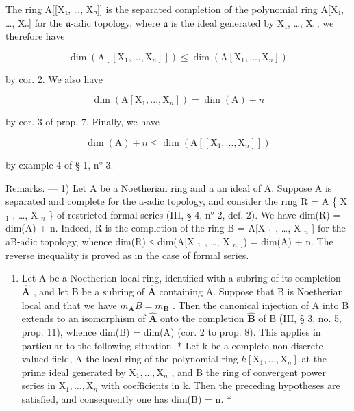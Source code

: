 The ring A{[}{[}X₁, \ldots, Xₙ{]}{]} is the separated completion of the polynomial ring A{[}X₁, \ldots, Xₙ{]} for the \(\mathfrak{a}\)-adic topology, where \(\mathfrak{a}\) is the ideal generated by X₁, \ldots, Xₙ; we therefore have

\[
\dim (\mathrm{A} [ [ \mathrm{X} _ {1},..., \mathrm{X} _ {n} ] ]) \leqslant \dim (\mathrm{A} [ \mathrm{X} _ {1},..., \mathrm{X} _ {n} ])
\]

by cor. 2. We also have

\[
\dim (\mathrm{A} [ \mathrm{X} _ {1},..., \mathrm{X} _ {n} ]) = \dim (\mathrm{A}) + n
\]

by cor. 3 of prop. 7. Finally, we have

\[
\dim (\mathrm{A}) + n \leqslant \dim (\mathrm{A} [ [ \mathrm{X} _ {1},..., \mathrm{X} _ {n} ] ])
\]

by example 4 of § 1, n° 3.

Remarks. --- 1) Let A be a Noetherian ring and a an ideal of A. Suppose A is separated and complete for the a-adic topology, and consider the ring R = A \{ X \(_{1}\) , \ldots, X \(_{n}\) \} of restricted formal series (III, § 4, n° 2, def. 2). We have dim(R) = dim(A) + n. Indeed, R is the completion of the ring B = A{[}X \(_{1}\) , \ldots, X \(_{n}\) {]} for the aB-adic topology, whence dim(R) ≤ dim(A{[}X \(_{1}\) , \ldots, X \(_{n}\) {]}) = dim(A) + n. The reverse inequality is proved as in the case of formal series.

\begin{enumerate}
\def\labelenumi{\arabic{enumi})}
\setcounter{enumi}{1}
\tightlist
\item
  Let A be a Noetherian local ring, identified with a subring of its completion \(\hat{\mathbf{A}}\) , and let B be a subring of \(\hat{\mathbf{A}}\) containing A. Suppose that B is Noetherian local and that we have \(m_{\mathbf{A}}B = m_{\mathbf{B}}\) . Then the canonical injection of A into B extends to an isomorphism of \(\hat{\mathbf{A}}\) onto the completion \(\hat{\mathbf{B}}\) of B (III, § 3, no. 5, prop. 11), whence dim(B) = dim(A) (cor. 2 to prop. 8). This applies in particular to the following situation. * Let k be a complete non-discrete valued field, A the local ring of the polynomial ring \(k[\mathrm{X}_1, ..., \mathrm{X}_n]\) at the prime ideal generated by \(\mathrm{X}_1, ..., \mathrm{X}_n\) , and B the ring of convergent power series in \(\mathrm{X}_1, ..., \mathrm{X}_n\) with coefficients in k. Then the preceding hypotheses are satisfied, and consequently one has dim(B) = n. *
\end{enumerate}

